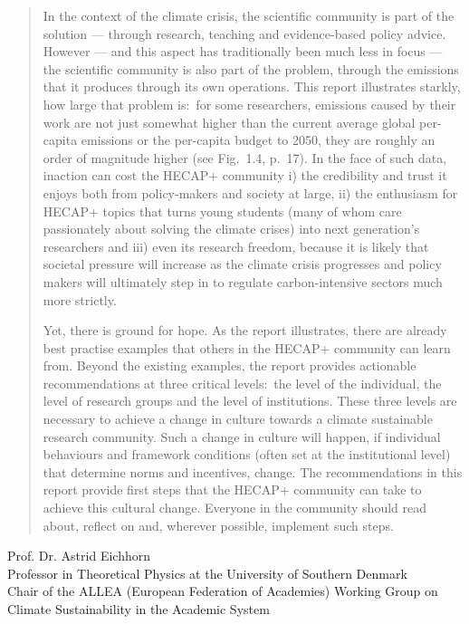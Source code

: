 \documentclass[../SustainableHEP.tex]{subfiles}
\begin{document}
\begin{quotation}
In the context of the climate crisis, the scientific community is part of the solution --- through research, teaching and evidence-based policy advice. However --- and this aspect has traditionally been much less in focus --- the scientific community is also part of the problem, through the emissions that it produces through its own operations.
This report illustrates starkly, how large that problem is:\ for some researchers, emissions caused by their work are not just somewhat higher than the current average global per-capita emissions or the per-capita budget to 2050, they are roughly an order of magnitude higher (see Fig.~1.4, p.~17). In the face of such data, inaction can cost the HECAP+ community i) the credibility and trust it enjoys both from policy-makers and society at large, ii) the enthusiasm for HECAP+ topics that turns young students (many of whom care passionately about solving the climate crises) into next generation’s researchers and iii) even its research freedom, because it is likely that societal pressure will increase as the climate crisis progresses and policy makers will ultimately step in to regulate carbon-intensive sectors much more strictly.

Yet, there is ground for hope. As the report illustrates, there are already best practise examples that others in the HECAP+ community can learn from. Beyond the existing examples, the report provides actionable recommendations at three critical levels:\ the level of the individual, the level of research groups and the level of institutions. These three levels are necessary to achieve a change in culture towards a climate sustainable research community. Such a change in culture will happen, if individual behaviours and framework conditions (often set at the institutional level) that determine norms and incentives, change. The recommendations in this report provide first steps that the HECAP+ community can take to achieve this cultural change. Everyone in the community should read about, reflect on and, wherever possible, implement such steps.
\end{quotation}
\begin{flushleft}
Prof. Dr. Astrid Eichhorn\\
Professor in Theoretical Physics at the University of Southern Denmark\\
Chair of the ALLEA (European Federation of Academies) Working Group on Climate Sustainability in the Academic System
\end{flushleft}
\end{document}
